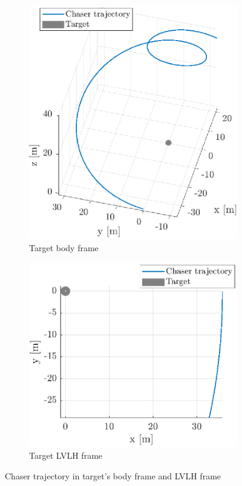 \begin{figure}[!h]
    \begin{subfigure}[b]{0.48\textwidth}
    \centering
    \includegraphics[clip,trim = 0cm 0cm 0cm 1cm,width=\linewidth]{Images/bodyttraj.eps}
    \caption{Target body frame}
    \label{fig:trajbody}
    \end{subfigure}\hfill
    \begin{subfigure}[b]{0.48\textwidth}
    \centering
    \includegraphics[clip,trim = 0cm 2cm 0cm 1cm,width=\linewidth]{Images/lvlhttaj.eps}
    \caption{Target LVLH frame}
    \label{fig:trajLVLH}
    \end{subfigure}
    \caption{Chaser trajectory in target's body frame and LVLH frame}
    \label{fig:trak}
\end{figure}
